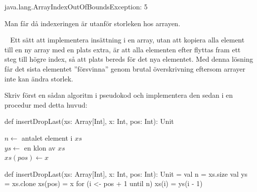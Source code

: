 \SubtaskSolved  \begin{REPL}
java.lang.ArrayIndexOutOfBoundsException: 5
\end{REPL}
Man får  då indexeringen är utanför storleken hos arrayen.

\QUESTEND





\QUESTBEGIN

\Task  \what~  Ett sätt att implementera insättning i en array, utan att kopiera alla element till en ny array med en plats extra, är att alla elementen efter  flyttas fram ett steg till högre index, så att plats bereds för det nya elementet. Med denna lösning får det sista elementet ''försvinna'' genom brutal överskrivning eftersom arrayer inte kan ändra storlek.

Skriv först en sådan algoritm i pseudokod och implementera den sedan i en procedur med detta huvud:
\begin{Code}
def insertDropLast(xs: Array[Int], x: Int, pos: Int): Unit
\end{Code}

\SOLUTION

\TaskSolved \what

\begin{algorithm}[H]

 $n \leftarrow$ antalet element i $xs$\\
 $ys \leftarrow$ en klon av $xs$\\
 $xs(pos) \leftarrow x$\\
\end{algorithm}

\begin{Code}
def insertDropLast(xs: Array[Int], x: Int, pos: Int): Unit = {
  val n = xs.size
  val ys = xs.clone
  xs(pos) = x
  for (i <- pos + 1 until n) xs(i) = ys(i - 1)
}
\end{Code}

\QUESTEND




\clearpage


